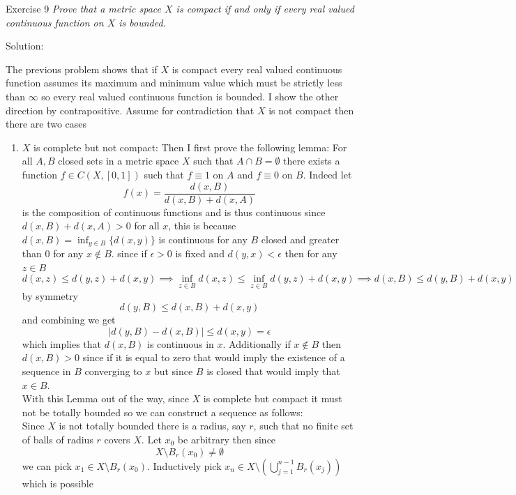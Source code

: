 \documentclass[11pt]{article}
\newcommand{\solution}[1]{{{\textcolor{header}{Solution:} \textcolor{solution}{#1}}}}
\begin{document}
Exercise 9
\emph{
Prove that a metric space $X$ is compact if and only if every real valued continuous function on $X$ is bounded.
}
\solution{
    The previous problem shows that if $X$ is compact every real valued continuous function assumes its maximum and minimum value which must be strictly less than  $\infty$ so
    every real valued continuous function is bounded. I show the other direction by contrapositive. Assume for contradiction
    that $X$ is not compact then there are two cases
    \begin{enumerate}
        \item $X$ is complete but not compact: Then I first prove the following lemma: For all $A, B$ closed sets in a metric space  $X$ such that  $A \cap B = \emptyset$ there exists a function  $f \in C(X,[0,1])$ such that $f \equiv 1$ on $A$ and  $f \equiv 0$ on  $B$.
            Indeed let
            \[
            f(x) = \frac{d(x,B)}{d(x,B) + d(x,A)}
            \] 
            is the composition of continuous functions and is thus continuous since $d(x,B) + d(x,A) > 0$ for all  $x$, this is because $d(x,B) = \inf_{y \in B}\{d(x,y)\}$ is continuous for any  $B$ closed and greater than 0 for any $x \not\in B$. since if  $\epsilon > 0$ is fixed
            and $d(y,x) < \epsilon$ then for any $z \in B$
            \[
                d(x,z) \le d(y,z) + d(x,y) \implies \inf_{z \in B} d(x,z) \le \inf_{z \in B} d(y,z) + d(x,y) \implies d(x,B) \le d(y,B) + d(x,y)
            \] 
            by symmetry
            \[
            d(y,B) \le d(x,B) + d(x,y)
            \] 
            and combining we get
            \[
            |d(y,B) - d(x,B)| \le d(x,y)  = \epsilon
            \] 
            which implies that $d(x,B)$ is continuous in  $x$. Additionally if  $x \not\in B$ then  $d(x,B) > 0$ since if it is equal to zero
            that would imply the existence of a sequence in  $B$ converging to  $x$ but since  $B$ is closed that would imply that  $x \in B$.
            \\
            With this Lemma out of the way, since  $X$ is complete but compact it must not be totally bounded so we can construct a sequence as follows:\\
            Since $X$ is not totally bounded there is a radius, say  $r$, such that no finite set of balls of radius  $r$ covers  $X$. Let $x_0$ be arbitrary 
            then since
            \[
            X \setminus B_r(x_0) \ne \emptyset
            \] 
            we can pick $x_1 \in X \setminus B_r(x_0)$. Inductively pick $x_n \in X \setminus (\bigcup_{j=1}^{n-1}B_r(x_j))$ which is possible

\end{enumerate}}
\end{document}
